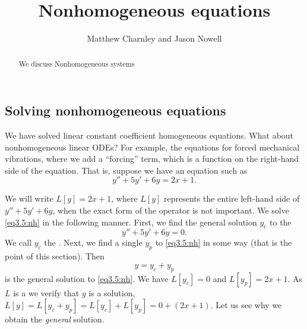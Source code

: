 \documentclass{ximera}
\title{Nonhomogeneous equations}
\author{Matthew Charnley and Jason Nowell}
\begin{document}
\begin{abstract}
    We discuss Nonhomogeneous systems
\end{abstract}
\maketitle

\label{sec:nonhom}



\subsection{Solving nonhomogeneous equations}

We have solved linear constant coefficient homogeneous equations. What about nonhomogeneous linear ODEs? For example, the equations for forced mechanical vibrations, where we add a ``forcing'' term, which is a function on the right-hand side of the equation.
That is, suppose we have an equation such as
\begin{equation} \label{eq3.5:nh}
    y'' + 5y'+ 6y = 2x+1 .
\end{equation}


We will write $L[y] = 2x+1$, where $L[y]$ represents the entire left-hand side of $y'' + 5y' + 6y$, when the exact form of the operator is not important. We solve \eqref{eq3.5:nh} in the following manner.  First, we find the general solution $y_c$ to the \emph{}
\begin{equation} \label{eq3.5:h}
    y'' + 5y'+ 6y = 0 .
\end{equation}
We call $y_c$ the \emph{}. Next, we find a single \emph{} $y_p$ to \eqref{eq3.5:nh} in some way (that is the point of this section).  Then
\begin{equation*}
    y = y_c + y_p
\end{equation*}
is the general solution to \eqref{eq3.5:nh}. We have $L[y_c] = 0$ and $L[y_p] = 2x+1$. As $L$ is a \emph{} we verify that $y$ is a solution, $L[y] = L [y_c + y_p] = L[y_c] + L[y_p] = 0 + (2x+1)$.  Let us see why we obtain the \emph{general} solution.
\end{document}

